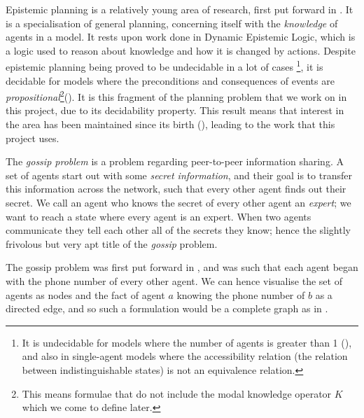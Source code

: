 \documentclass[ %
                    author={Leo Poulson},
                supervisor={Dr. Steven Ramsay},
                    degree={BSc},
                     title={Epistemic Planning for the Dynamic Gossip problem},
                  subtitle={},
                      year={2019} ]{dissertation}
\begin{document}
Epistemic planning is a relatively young area of research, first put forward in
\cite{BolanderEP}. It is a specialisation of general planning, concerning itself
with the \emph{knowledge} of agents in a model. It rests upon work done in
Dynamic Epistemic Logic, which is a logic used to reason about knowledge and how
it is changed by actions. Despite epistemic planning being proved to be
undecidable in a lot of cases \footnote{It is undecidable for models where the
  number of agents is greater than 1 (\cite{UndecidabilityEP}), and also in
  single-agent models where the accessibility relation (the relation between
  indistinguishable states) is not an equivalence relation.}, it is decidable
for models where the preconditions and consequences of events are
\emph{propositional}\footnote{This means formulae that do not include the modal
  knowledge operator $K$ which we come to define later.}(\cite{DecidabilityEp}).
It is this fragment of the planning problem that we work on in this project, due
to its decidability property. This result means that interest in the area has
been maintained since its birth (\cite{AutomataTechniques}), leading to the work
that this project uses.

The \emph{gossip problem} is a problem regarding peer-to-peer information sharing. A
set of agents start out with some \emph{secret information}, and their goal is
to transfer this information across the network, such that every other agent
finds out their secret. We call an agent who knows the secret of every other
agent an \emph{expert}; we want to reach a state where every agent is an
expert. When two agents communicate they tell each other all of the secrets they
know; hence the slightly frivolous but very apt title of the \emph{gossip}
problem.

The gossip problem was first put forward in \cite{Tijdeman:1971}, and was such
that each agent began with the phone number of every other agent. We can hence
visualise the set of agents as nodes and the fact of agent $a$ knowing the phone
number of $b$ as a directed edge, and so such a formulation would be a complete
graph as in .
\end{document}
